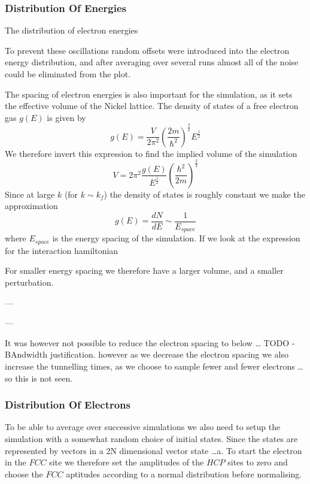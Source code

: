 \subsubsection{Distribution Of Energies}
The distribution of electron energies

To prevent these oscillations random offsets were introduced
into the electron energy distribution, and after
averaging over several runs almost all of the
noise could be eliminated from the plot.

The spacing of electron energies is also
important for the simulation, as it
sets the effective volume of the Nickel
lattice. The density of states of a free electron
gas \(g(E)\) is given by~\cite{KittelCharles1953Itss}
\begin{equation}
    g(E) = \frac{V}{2\pi^2}
    {(\frac{2m}{\hbar^2})}^{\frac{3}{2}}
    E^{\frac{1}{2}}
\end{equation}
We therefore invert this expression
to find the implied volume of the
simulation
\begin{equation}
    V = 2\pi^2
    \frac{g(E)}{E^{\frac{1}{2}}}
    {(\frac{\hbar^2}{2m})}^{\frac{3}{2}}
\end{equation}
Since at large \(k\)
(for \(k\sim k_f\))
the density of states is roughly
constant we make the approximation
\begin{equation}
    g(E) = \frac{dN}{dE} \sim \frac{1}{E_{space}}
\end{equation}
where \(E_{space}\) is the energy spacing
of the simulation.
If we look at the expression for the
interaction hamiltonian


For smaller
energy spacing we therefore have
a larger volume, and a smaller
perturbation.

---

---

It was however not possible to
reduce the electron spacing to
below \ldots
TODO -BAndwidth justification.
however as we decrease the electron
spacing we also increase the tunnelling
times, as we choose to sample fewer and
fewer electrons \ldots so this is not seen.

\subsubsection{Distribution Of Electrons}
To be able to average over successive
simulations we also need to setup the
simulation with a somewhat random
choice of initial states. Since the states
are represented by vectors in a 2N dimensional
vector state \ldots a. To start the electron
in the \(FCC\) site we therefore set the
amplitudes of the \(HCP\) sites to zero
and choose the \(FCC\) aptitudes according to
a normal distribution before normalising.

